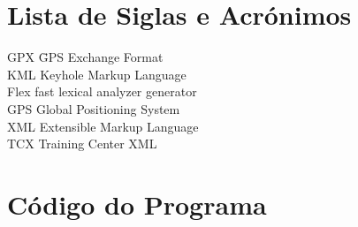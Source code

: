 \documentclass{llncs}
\begin{document}
\section{Lista de Siglas e Acrónimos}
\begin{tabbing}
GPX \= GPS Exchange Format \\
KML \> Keyhole Markup Language \\
Flex \> fast lexical analyzer generator \\
GPS \> Global Positioning System \\
XML \> Extensible Markup Language \\
TCX \> Training Center XML
\end{tabbing}

\appendix
\section{Código do Programa}
\end{document}
